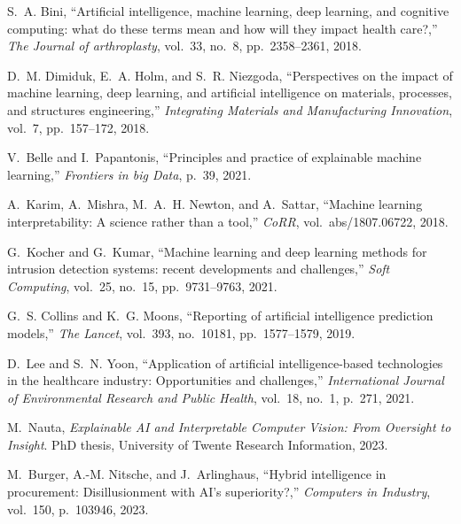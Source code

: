 \documentclass{article}
\begin{document}
\begin{thebibliography}{100}
	
	S.~A. Bini, ``Artificial intelligence, machine learning, deep learning, and
	cognitive computing: what do these terms mean and how will they impact health
	care?,'' {\em The Journal of arthroplasty}, vol.~33, no.~8, pp.~2358--2361,
	2018.
	
	D.~M. Dimiduk, E.~A. Holm, and S.~R. Niezgoda, ``Perspectives on the impact of
	machine learning, deep learning, and artificial intelligence on materials,
	processes, and structures engineering,'' {\em Integrating Materials and
		Manufacturing Innovation}, vol.~7, pp.~157--172, 2018.
	
	V.~Belle and I.~Papantonis, ``Principles and practice of explainable machine
	learning,'' {\em Frontiers in big Data}, p.~39, 2021.
	
	A.~Karim, A.~Mishra, M.~A.~H. Newton, and A.~Sattar, ``Machine learning
	interpretability: {A} science rather than a tool,'' {\em CoRR},
	vol.~abs/1807.06722, 2018.
	
	G.~Kocher and G.~Kumar, ``Machine learning and deep learning methods for
	intrusion detection systems: recent developments and challenges,'' {\em Soft
		Computing}, vol.~25, no.~15, pp.~9731--9763, 2021.
	
	G.~S. Collins and K.~G. Moons, ``Reporting of artificial intelligence
	prediction models,'' {\em The Lancet}, vol.~393, no.~10181, pp.~1577--1579,
	2019.
	
	D.~Lee and S.~N. Yoon, ``Application of artificial intelligence-based
	technologies in the healthcare industry: Opportunities and challenges,'' {\em
		International Journal of Environmental Research and Public Health}, vol.~18,
	no.~1, p.~271, 2021.
	
	M.~Nauta, {\em Explainable {AI} and Interpretable Computer Vision: From
		Oversight to Insight}.
	\newblock PhD thesis, University of Twente Research Information, 2023.
	
	M.~Burger, A.-M. Nitsche, and J.~Arlinghaus, ``Hybrid intelligence in
	procurement: Disillusionment with {AI’s} superiority?,'' {\em Computers in
		Industry}, vol.~150, p.~103946, 2023.
	

\end{thebibliography}
\end{document}

